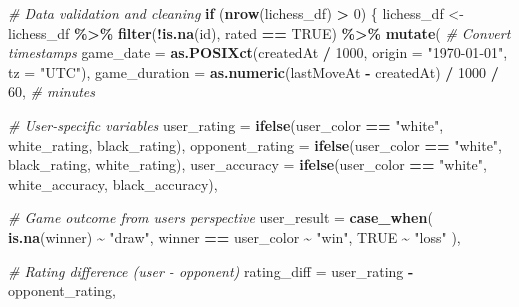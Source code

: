 \documentclass[
]{article}
\newenvironment{Shaded}{\begin{snugshade}}{\end{snugshade}}
\newcommand{\AttributeTok}[1]{\textcolor[rgb]{0.13,0.29,0.53}{#1}}
\newcommand{\CommentTok}[1]{\textcolor[rgb]{0.56,0.35,0.01}{\textit{#1}}}
\newcommand{\ConstantTok}[1]{\textcolor[rgb]{0.56,0.35,0.01}{#1}}
\newcommand{\ControlFlowTok}[1]{\textcolor[rgb]{0.13,0.29,0.53}{\textbf{#1}}}
\newcommand{\DecValTok}[1]{\textcolor[rgb]{0.00,0.00,0.81}{#1}}
\newcommand{\FunctionTok}[1]{\textcolor[rgb]{0.13,0.29,0.53}{\textbf{#1}}}
\newcommand{\NormalTok}[1]{#1}
\newcommand{\OtherTok}[1]{\textcolor[rgb]{0.56,0.35,0.01}{#1}}
\newcommand{\SpecialCharTok}[1]{\textcolor[rgb]{0.81,0.36,0.00}{\textbf{#1}}}
\newcommand{\StringTok}[1]{\textcolor[rgb]{0.31,0.60,0.02}{#1}}
\begin{document}
\begin{Shaded}
\begin{Highlighting}[]
\CommentTok{\# Data validation and cleaning}
\ControlFlowTok{if}\NormalTok{ (}\FunctionTok{nrow}\NormalTok{(lichess\_df) }\SpecialCharTok{\textgreater{}} \DecValTok{0}\NormalTok{) \{}
\NormalTok{  lichess\_df }\OtherTok{\textless{}{-}}\NormalTok{ lichess\_df }\SpecialCharTok{\%\textgreater{}\%}
    \FunctionTok{filter}\NormalTok{(}\SpecialCharTok{!}\FunctionTok{is.na}\NormalTok{(id), rated }\SpecialCharTok{==} \ConstantTok{TRUE}\NormalTok{) }\SpecialCharTok{\%\textgreater{}\%}
    \FunctionTok{mutate}\NormalTok{(}
      \CommentTok{\# Convert timestamps}
      \AttributeTok{game\_date =} \FunctionTok{as.POSIXct}\NormalTok{(createdAt }\SpecialCharTok{/} \DecValTok{1000}\NormalTok{, }\AttributeTok{origin =} \StringTok{"1970{-}01{-}01"}\NormalTok{, }\AttributeTok{tz =} \StringTok{"UTC"}\NormalTok{),}
      \AttributeTok{game\_duration =} \FunctionTok{as.numeric}\NormalTok{(lastMoveAt }\SpecialCharTok{{-}}\NormalTok{ createdAt) }\SpecialCharTok{/} \DecValTok{1000} \SpecialCharTok{/} \DecValTok{60}\NormalTok{, }\CommentTok{\# minutes}

      \CommentTok{\# User{-}specific variables}
      \AttributeTok{user\_rating =} \FunctionTok{ifelse}\NormalTok{(user\_color }\SpecialCharTok{==} \StringTok{"white"}\NormalTok{, white\_rating, black\_rating),}
      \AttributeTok{opponent\_rating =} \FunctionTok{ifelse}\NormalTok{(user\_color }\SpecialCharTok{==} \StringTok{"white"}\NormalTok{, black\_rating, white\_rating),}
      \AttributeTok{user\_accuracy =} \FunctionTok{ifelse}\NormalTok{(user\_color }\SpecialCharTok{==} \StringTok{"white"}\NormalTok{, white\_accuracy, black\_accuracy),}

      \CommentTok{\# Game outcome from user\textquotesingle{}s perspective}
      \AttributeTok{user\_result =} \FunctionTok{case\_when}\NormalTok{(}
        \FunctionTok{is.na}\NormalTok{(winner) }\SpecialCharTok{\textasciitilde{}} \StringTok{"draw"}\NormalTok{,}
\NormalTok{        winner }\SpecialCharTok{==}\NormalTok{ user\_color }\SpecialCharTok{\textasciitilde{}} \StringTok{"win"}\NormalTok{,}
        \ConstantTok{TRUE} \SpecialCharTok{\textasciitilde{}} \StringTok{"loss"}
\NormalTok{      ),}

      \CommentTok{\# Rating difference (user {-} opponent)}
      \AttributeTok{rating\_diff =}\NormalTok{ user\_rating }\SpecialCharTok{{-}}\NormalTok{ opponent\_rating,}


\end{Highlighting}
\end{Shaded}
\end{document}
